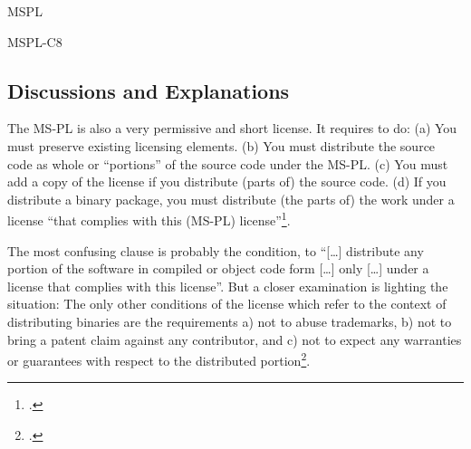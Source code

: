 \begin{license}{MSPL}
\begin{lsuc}{MSPL-C8}

  \begin{lsucrequires}
  
  
  \end{lsucrequires}

  \begin{lsucprohibits}
    \lsucitem{\noLogoOrTrademark} 
  \end{lsucprohibits}
\end{lsuc}

\subsection{Discussions and Explanations}

The MS-PL is also a very permissive and short license. It requires to do:
(a) You must preserve existing licensing elements. (b) You must distribute
the source code as whole or \enquote{portions} of the source code under the
MS-PL. (c) You must add a copy of the license if you distribute (parts of) the
source code. (d) If you distribute a binary package, you must distribute (the
parts of) the work under a license \enquote{that complies with this (MS-PL)
license}\footcite[cf.][\nopage wp]{MsplOsiLicense2013a}.

The most confusing clause is probably the condition, to \enquote{[\ldots]
distribute any portion of the software in compiled or object code form [\ldots]
only [\ldots] under a license that complies with this license}. But a closer
examination is lighting the situation: The only other conditions of the license
which refer to the context of distributing binaries are the requirements a) not
to abuse trademarks, b) not to bring a patent claim against any contributor, and
c) not to expect any warranties or guarantees with respect to the distributed
portion\footcite[cf.][\nopage wp.\ §3A, §3B, §3E]{MsplOsiLicense2013a}.


\end{license}
